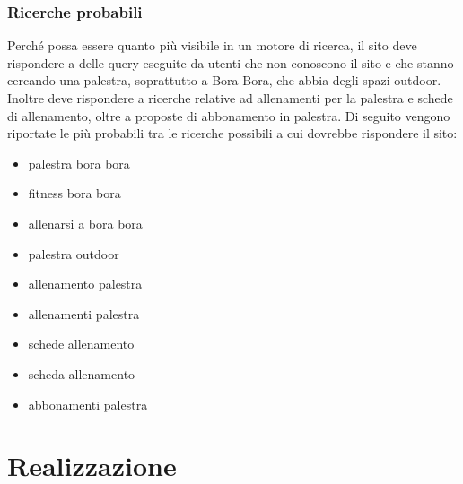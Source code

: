 \documentclass[a4paper]{article}
\begin{document}
	\subsubsection{Ricerche probabili}
	Perché possa essere quanto più visibile in un motore di ricerca, il sito deve rispondere a delle query eseguite da utenti che non conoscono il sito e che stanno cercando una palestra, soprattutto a Bora Bora, che abbia degli spazi outdoor. Inoltre deve rispondere a ricerche relative ad allenamenti per la palestra e schede di allenamento, oltre a proposte di abbonamento in palestra. Di seguito vengono riportate le più probabili tra le ricerche possibili a cui dovrebbe rispondere il sito:
	\begin{itemize}
		\item palestra bora bora
		\item fitness bora bora
		\item allenarsi a bora bora
		\item palestra outdoor
		\item allenamento palestra
		\item allenamenti palestra
		\item schede allenamento
		\item scheda allenamento
		\item abbonamenti palestra
	\end{itemize}

	\section{Realizzazione}
\end{document}
